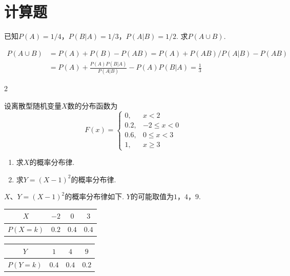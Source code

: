 \clearpage
\section{计算题}

\begin{problem}
    已知$P(A)=1/4$，$P(B|A)=1/3$，$P(A|B)=1/2$. 求$P(A\cup B)$.
\end{problem}
\begin{solution}
    \[\begin{aligned}
        P(A\cup B)&=P(A)+P(B)-P(AB)=P(A)+P(AB)/P(A|B)-P(AB)\\
        &=P(A)+\frac{P(A)P(B|A)}{P(A|B)}-P(A)P(B|A)=\frac13
    \end{aligned}\]
\end{solution}

\begin{paracol}{2}
\begin{problem}
    设离散型随机变量$X$数的分布函数为
    \[F(x)=\begin{cases}
        0, & x<2\\
        0.2, & -2\leq x<0\\
        0.6, & 0\leq x<3\\
        1, & x\geq3
    \end{cases}\]
    \switchcolumn
    \begin{enumerate}
        \item 求$X$的概率分布律.
        \item 求$Y=(X-1)^2$的概率分布律.
    \end{enumerate}
\end{problem}
\end{paracol}
\begin{solution}
    $X$、$Y=(X-1)^2$的概率分布律如下. $Y$的可能取值为$1$，$4$，$9$.
    \begin{table}[htbp]
        \begin{minipage}{.48\textwidth}
            \centering
            \begin{tabular}{cccc}
                \toprule
                $X$ & $-2$ & $0$ & $3$\\
                \midrule
                $P(X=k)$ & $0.2$ & $0.4$ & $0.4$\\
                \bottomrule
            \end{tabular}
        \end{minipage}
        \hfill
        \begin{minipage}{.48\textwidth}
            \centering
            \begin{tabular}{cccc}
                \toprule
                $Y$ & $1$ & $4$ & $9$\\
                \midrule
                $P(Y=k)$ & $0.4$ & $0.4$ & $0.2$\\
                \bottomrule
            \end{tabular}
        \end{minipage}
    \end{table}
\end{solution}

